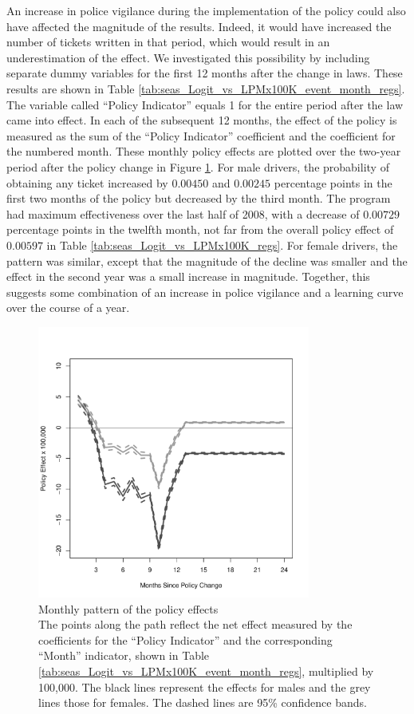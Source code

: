 An increase in police vigilance during the implementation of the policy 
could also have affected the magnitude of the results. 
Indeed, it would have increased the number of tickets written in that period, 
which would result in an underestimation of the effect. 
% 
We investigated this possibility by including separate dummy variables
for the first 12 months after the change in laws. 
These results are shown in 
Table \ref{tab:seas_Logit_vs_LPMx100K_event_month_regs}. 
The variable called ``Policy Indicator'' equals 1 for the entire period after
the law came into effect. 
In each of the subsequent 12 months, the effect of the policy is measured 
as the sum of the ``Policy Indicator'' coefficient 
and the coefficient for the numbered month. 
% 
These monthly policy effects are plotted over the two-year period 
after the policy change in Figure \ref{fig:event_study}.
% 
For male drivers, the probability of obtaining any ticket increased by 
$0.00450$ and $0.00245$ percentage points in the first two months of the policy
but decreased by the third month. 
The program had maximum effectiveness over the last half of 2008, 
with a decrease of $0.00729$ percentage points in the twelfth month,
not far from the overall policy effect of $0.00597$ in 
Table \ref{tab:seas_Logit_vs_LPMx100K_regs}. 
% 
For female drivers, the pattern was similar, except that the magnitude 
of the decline was smaller and the effect in the second year was a
small increase in magnitude. 
% 
Together, this suggests some combination of an increase in police vigilance 
and a learning curve over the course of a year. 

\begin{figure}
\centering
\includegraphics[width=0.8\textwidth]{Figures/Event_Study}
\caption{Monthly pattern of the policy effects \\
The points along the path reflect the net effect measured by 
the coefficients for the ``Policy Indicator'' 
and the corresponding ``Month'' indicator, 
shown in Table \ref{tab:seas_Logit_vs_LPMx100K_event_month_regs}, 
multiplied by 100,000. 
The black lines represent the effects for males 
and the grey lines those for females. 
The dashed lines are 95\% confidence bands. 
}\label{fig:event_study}
\end{figure}




